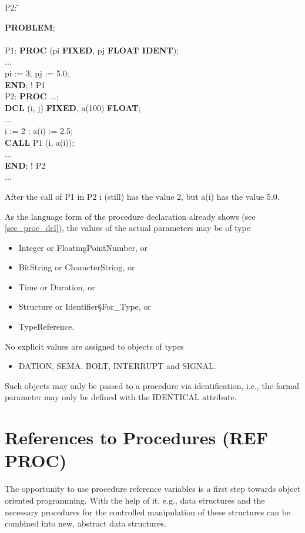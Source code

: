\begin{tabbing}
P2: \= \kill

{\bf PROBLEM}; \> \\
    \> \\
P1: \> {\bf PROC} (pi {\bf FIXED}, pj {\bf FLOAT IDENT});\\
    \> ... \\
    \> pi := 3; pj := 5.0;\\
    \> {\bf END}; ! P1\\

P2: \> {\bf PROC} ...;\\
    \> {\bf DCL} (i, j) {\bf FIXED}, a(100) {\bf FLOAT};\\
    \> ... \\
    \> i := 2 ; a(i) := 2.5; \\
    \> {\bf CALL} P1 (i, a(i));\\
    \> ... \\
    \> {\bf END}; ! P2 \\
... \>
\end{tabbing}

After the call of P1 in P2 i (still) has the value 2, but a(i) has the
value 5.0.

As the language form of the procedure declaration already shows (see
\ref{sec_proc_dcl}), the values of the actual parameters may be of type
\begin{itemize}
\item Integer or FloatingPointNumber, or
\item BitString or CharacterString, or
\item Time or Duration, or
\item Structure or Identifier\S For\_Type, or
\item TypeReference.
\end{itemize}
No explicit values are assigned to objects of types
\begin{itemize}
\item DATION, SEMA, BOLT, INTERRUPT and SIGNAL.
\end{itemize}
Such objects may only be passed to a procedure via identification, i.e.,
the formal parameter may only be defined with the IDENTICAL attribute.

\section{References to Procedures (REF PROC)}  %
\label{sec_ref_proc}

The opportunity to use procedure reference variables is a first step
towards object oriented programming. With the help of it, e.g., data
structures and the necessary procedures for the controlled manipulation of
these structures can be combined into new, abstract data structures.

